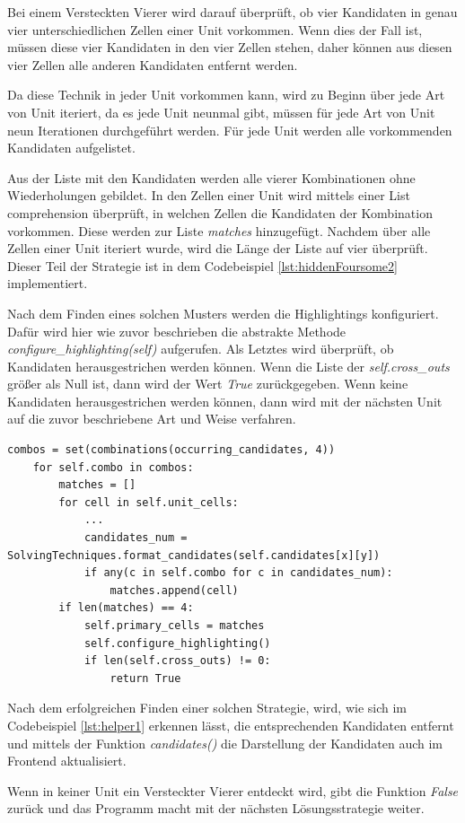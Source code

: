 Bei einem Versteckten Vierer wird darauf überprüft, ob vier Kandidaten in genau vier unterschiedlichen Zellen einer Unit vorkommen. Wenn dies der Fall ist, müssen diese vier Kandidaten in den vier Zellen stehen, daher können aus diesen vier Zellen alle anderen Kandidaten entfernt werden.

Da diese Technik in jeder Unit vorkommen kann, wird zu Beginn über jede Art von Unit iteriert, da es jede Unit neunmal gibt, müssen für jede Art von Unit neun Iterationen durchgeführt werden. Für jede Unit werden alle vorkommenden Kandidaten aufgelistet.

Aus der Liste mit den Kandidaten werden alle vierer Kombinationen ohne Wiederholungen gebildet. In den Zellen einer Unit wird mittels einer List comprehension überprüft, in welchen Zellen die Kandidaten der Kombination vorkommen. Diese werden zur Liste \textit{matches} hinzugefügt. Nachdem über alle Zellen einer Unit iteriert wurde, wird die Länge der Liste auf vier überprüft. Dieser Teil der Strategie ist in dem Codebeispiel \ref{lst:hiddenFoursome2} implementiert. 

Nach dem Finden eines solchen Musters werden die Highlightings konfiguriert. Dafür wird hier wie zuvor beschrieben die abstrakte Methode \textit{configure\_highlighting(self)} aufgerufen. Als Letztes wird überprüft, ob Kandidaten herausgestrichen werden können. Wenn die Liste der \textit{self.cross\_outs} größer als Null ist, dann wird der Wert \textit{True} zurückgegeben. Wenn keine Kandidaten herausgestrichen werden können, dann wird mit der nächsten Unit auf die zuvor beschriebene Art und Weise verfahren.

\begin{lstlisting}[caption={Versteckter Vierer Teil 2}, label={lst:hiddenFoursome2}]
	combos = set(combinations(occurring_candidates, 4))
	for self.combo in combos:
		matches = []
		for cell in self.unit_cells:
			...
			candidates_num = SolvingTechniques.format_candidates(self.candidates[x][y])
			if any(c in self.combo for c in candidates_num):
				matches.append(cell)
		if len(matches) == 4:
			self.primary_cells = matches
			self.configure_highlighting()
			if len(self.cross_outs) != 0:
				return True
\end{lstlisting}

Nach dem erfolgreichen Finden einer solchen Strategie, wird, wie sich im Codebeispiel \ref{lst:helper1} erkennen lässt, die entsprechenden Kandidaten entfernt und mittels der Funktion \textit{candidates()} die Darstellung der Kandidaten auch im Frontend aktualisiert. 

Wenn in keiner Unit ein Versteckter Vierer entdeckt wird, gibt die Funktion \textit{False} zurück und das Programm macht mit der nächsten Lösungsstrategie weiter.
